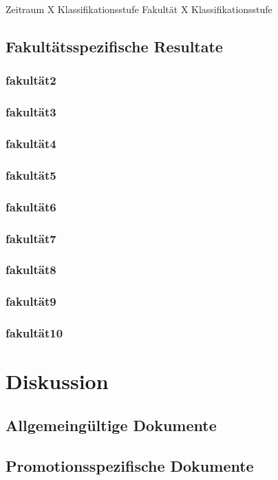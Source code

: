 Zeitraum X Klassifikationsstufe
Fakultät X Klassifikationsstufe








\subsection{Fakultätsspezifische Resultate}\label{sec:luh-repo-results-specific}
\subsubsection{\gls{fakultät2}}
\subsubsection{\gls{fakultät3}}
\subsubsection{\gls{fakultät4}}
\subsubsection{\gls{fakultät5}}
\subsubsection{\gls{fakultät6}}
\subsubsection{\gls{fakultät7}}
\subsubsection{\gls{fakultät8}}
\subsubsection{\gls{fakultät9}}
\subsubsection{\gls{fakultät10}}

\section{Diskussion}\label{sec:luh-repo-discussion}
\subsection{Allgemeingültige Dokumente}\label{sec:luh-repo-discussion-general}
\subsection{Promotionsspezifische Dokumente}\label{sec:luh-repo-discussion-specific}

